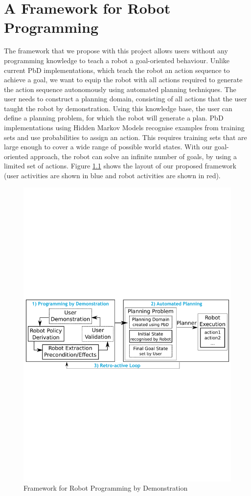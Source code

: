 \chapter{A Framework for Robot Programming}\label{sec:Contribution}
The framework that we propose with this project allows users without any programming knowledge to teach a robot a goal-oriented behaviour. 
Unlike current PbD implementations, which teach the robot an action sequence to achieve a goal, we want to equip the robot with all actions required to generate the action sequence autonomously using automated planning techniques. The user needs to construct a planning domain, consisting of all actions that the user taught the robot by demonstration. Using this knowledge base, the user can define a planning problem, for which the robot will generate a plan. PbD implementations using Hidden Markov Models recognise examples from training sets and use probabilities to assign an action. This requires training sets that are large enough to cover a wide range of possible world states. With our goal-oriented approach, the robot can solve an infinite number of goals, by using a limited set of actions. Figure \ref{fig:framework} shows the layout of our proposed framework (user activities are shown in blue and robot activities are shown in red). 

  \begin{figure}[!h]
    \centering
    \includegraphics[scale=0.66]{figures/framework2}
    \caption{Framework for Robot Programming by Demonstration}
    \label{fig:framework}
  \end{figure}

